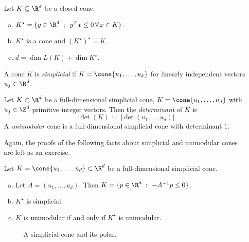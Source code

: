 \begin{lemma}
  \label{lemma:cone-polars}
  Let $K \subseteq \R^d$ be a closed cone.
  \begin{enumerate}[(a)]
    \item $K^\star = \{ y \in \R^d ~:~ y^Tx \leq 0 \,\forall\, x\in K \}$.
    \item $K^\star$ is a cone and $(K^\star)^\star = K$.
    \item $d = \dim L(K) + \dim K^\star$.
  \end{enumerate}
\end{lemma}

\begin{definition}
  A cone $K$ is \emph{simplicial} if $K = \cone\{ u_1, \ldots, u_k \}$ for linearly independent vectors $u_j \in \R^d$.
\end{definition}

\begin{definition}
  Let $K \subset \R^d$ be a full-dimensional simplicial cone,
  $K = \cone\{ u_1, \ldots, u_d \}$
  with $u_j \in \Z^d$ primitive integer vectors.
  Then the \emph{determinant} of $K$ is
  \[
    \det(K) := |\det(u_1,\ldots,u_d)|
  \]
  A \emph{unimodular} cone is a full-dimensional simplicial cone with determinant $1$.
\end{definition}

Again, the proofs of the following facts about simplicial and unimodular cones are left as an exercise.

\begin{lemma}
  \label{lemma:simplicial-cone-polars}
  Let $K = \cone\{u_1,\ldots,u_d\} \subset \R^d$ be a full-dimensional simplicial cone.
  \begin{enumerate}[(a)]
    \item Let $A = (u_1, \ldots, u_d)$. Then $K = \{ p \in \R^d ~:~ -A^{-1} p \leq 0 \}$.
    \item $K^\star$ is simplicial.
    \item $K$ is unimodular if and only if $K^\star$ is unimodular.
  \end{enumerate}
\end{lemma}

\begin{figure}
  \begin{center}
  \end{center}
  \caption{A simplicial cone and its polar.}
\end{figure}


